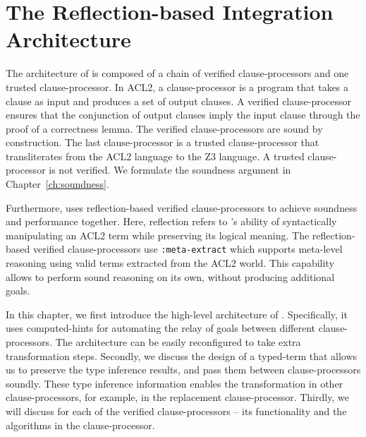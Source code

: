 \chapter{The Reflection-based Integration Architecture}
\label{ch:arch}

The architecture of \smtlink{} is composed of a chain of verified
clause-processors and one trusted clause-processor.
In ACL2, a clause-processor is a program that takes a clause as input and
produces a set of output clauses.
A verified clause-processor ensures that the conjunction of output clauses imply
the input clause through the proof of a correctness lemma.
The verified clause-processors are sound by construction. The last
clause-processor is a trusted clause-processor that transliterates from the ACL2
language to the Z3 language. A trusted clause-processor is not verified. We
formulate the soundness argument in Chapter~\ref{ch:soundness}.

Furthermore, \smtlink{} uses reflection-based verified clause-processors to
achieve soundness and performance together.
Here, reflection refers to \smtlink{}'s ability of syntactically manipulating
an ACL2 term while preserving its logical meaning.
The reflection-based verified clause-processors use \texttt{:meta-extract} which
supports meta-level reasoning using valid terms extracted from the ACL2 world.
This capability allows \smtlink{} to perform sound reasoning on its own, without
producing additional goals.

In this chapter, we first introduce the high-level architecture of \smtlink{}.
Specifically, it uses computed-hints for automating the relay of goals between
different clause-processors.
The architecture can be easily reconfigured to take extra transformation steps.
Secondly, we discuss the design of a typed-term that allows us to preserve the
type inference results, and pass them between clause-processors soundly.
These type inference information enables the transformation in other
clause-processors, for example, in the replacement clause-processor.
Thirdly, we will discuss for each of the verified clause-processors -- its
functionality and the algorithms in the clause-processor.



